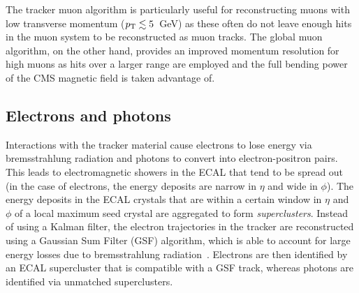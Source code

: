 The tracker muon algorithm is particularly useful for reconstructing muons with 
low transverse momentum (${p_{\text T}} \lesssim 5$~GeV) as these often do not leave 
enough hits in the muon system to be reconstructed as muon tracks. The global 
muon algorithm, on the other hand, provides an improved momentum resolution 
for high \pt muons as hits over a larger range are employed and the full 
bending power of the CMS magnetic field is taken advantage of.

\subsection{Electrons and photons}
Interactions with the tracker material cause electrons to lose energy via 
bremsstrahlung radiation and photons to convert into electron-positron pairs. 
This leads to electromagnetic showers in the ECAL that tend to be spread out 
(in the case of electrons, the energy deposits are narrow in $\eta$ and wide in 
$\phi$). The energy deposits in the ECAL crystals that are within a certain 
window in $\eta$ and $\phi$ of a local maximum seed crystal are aggregated to 
form \textit{superclusters}. 
Instead of using a Kalman filter, the electron trajectories in the tracker are 
reconstructed using a Gaussian Sum Filter (GSF) algorithm, which is able to 
account for large energy losses due to bremsstrahlung radiation~\cite{gsf}. 
Electrons are then identified by an ECAL supercluster that is compatible with a 
GSF track, whereas photons are identified via unmatched superclusters.





